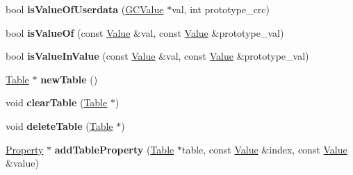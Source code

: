 \begin{DoxyCompactItemize}
\item 
bool {\bfseries is\+Value\+Of\+Userdata} (\hyperlink{struct_object_script_1_1_o_s_1_1_core_1_1_g_c_value}{G\+C\+Value} $\ast$val, int prototype\+\_\+crc)\hypertarget{class_object_script_1_1_o_s_1_1_core_ac16117f8c587d39a809714ce5ff66cea}{}\label{class_object_script_1_1_o_s_1_1_core_ac16117f8c587d39a809714ce5ff66cea}

\item 
bool {\bfseries is\+Value\+Of} (const \hyperlink{struct_object_script_1_1_o_s_1_1_core_1_1_value}{Value} \&val, const \hyperlink{struct_object_script_1_1_o_s_1_1_core_1_1_value}{Value} \&prototype\+\_\+val)\hypertarget{class_object_script_1_1_o_s_1_1_core_a4a8ebb26631e45f58fd7c6225b9ae9e3}{}\label{class_object_script_1_1_o_s_1_1_core_a4a8ebb26631e45f58fd7c6225b9ae9e3}

\item 
bool {\bfseries is\+Value\+In\+Value} (const \hyperlink{struct_object_script_1_1_o_s_1_1_core_1_1_value}{Value} \&val, const \hyperlink{struct_object_script_1_1_o_s_1_1_core_1_1_value}{Value} \&prototype\+\_\+val)\hypertarget{class_object_script_1_1_o_s_1_1_core_ab033efe57286a31b86d050c62d8a3e7f}{}\label{class_object_script_1_1_o_s_1_1_core_ab033efe57286a31b86d050c62d8a3e7f}

\item 
\hyperlink{struct_object_script_1_1_o_s_1_1_core_1_1_table}{Table} $\ast$ {\bfseries new\+Table} ()\hypertarget{class_object_script_1_1_o_s_1_1_core_abef8b4a359513e70544b8cf44ef47576}{}\label{class_object_script_1_1_o_s_1_1_core_abef8b4a359513e70544b8cf44ef47576}

\item 
void {\bfseries clear\+Table} (\hyperlink{struct_object_script_1_1_o_s_1_1_core_1_1_table}{Table} $\ast$)\hypertarget{class_object_script_1_1_o_s_1_1_core_aa44ea69365428f808b09cb7c5764e8fa}{}\label{class_object_script_1_1_o_s_1_1_core_aa44ea69365428f808b09cb7c5764e8fa}

\item 
void {\bfseries delete\+Table} (\hyperlink{struct_object_script_1_1_o_s_1_1_core_1_1_table}{Table} $\ast$)\hypertarget{class_object_script_1_1_o_s_1_1_core_a515778512b32caf60fbe521736e2805c}{}\label{class_object_script_1_1_o_s_1_1_core_a515778512b32caf60fbe521736e2805c}

\item 
\hyperlink{struct_object_script_1_1_o_s_1_1_core_1_1_property}{Property} $\ast$ {\bfseries add\+Table\+Property} (\hyperlink{struct_object_script_1_1_o_s_1_1_core_1_1_table}{Table} $\ast$table, const \hyperlink{struct_object_script_1_1_o_s_1_1_core_1_1_value}{Value} \&index, const \hyperlink{struct_object_script_1_1_o_s_1_1_core_1_1_value}{Value} \&value)\hypertarget{class_object_script_1_1_o_s_1_1_core_a506bb5f070e91cc999c2b97067b4794d}{}\label{class_object_script_1_1_o_s_1_1_core_a506bb5f070e91cc999c2b97067b4794d}


\end{DoxyCompactItemize}
